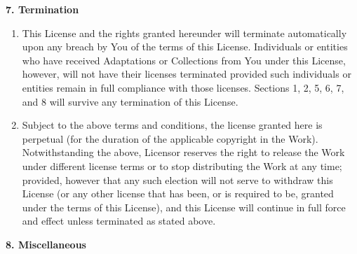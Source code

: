 \noindent \textbf{7. Termination}

\begin{enumerate}
\item
  This License and the rights granted hereunder will terminate
  automatically upon any breach by You of the terms of this License.
  Individuals or entities who have received Adaptations or
  Collections from You under this License, however, will not have
  their licenses terminated provided such individuals or entities
  remain in full compliance with those licenses. Sections 1, 2, 5, 6,
  7, and 8 will survive any termination of this License.
\item
  Subject to the above terms and conditions, the license granted here
  is perpetual (for the duration of the applicable copyright in the
  Work). Notwithstanding the above, Licensor reserves the right to
  release the Work under different license terms or to stop
  distributing the Work at any time; provided, however that any such
  election will not serve to withdraw this License (or any other
  license that has been, or is required to be, granted under the
  terms of this License), and this License will continue in full
  force and effect unless terminated as stated above.
\end{enumerate}

\noindent \textbf{8. Miscellaneous}

